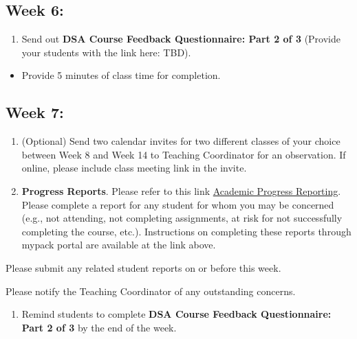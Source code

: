 \documentclass[
]{book}
\providecommand{\tightlist}{%
  \setlength{\itemsep}{0pt}\setlength{\parskip}{0pt}}
\begin{document}
\hypertarget{week-6}{%
\subsection{Week 6:}\label{week-6}}

\begin{enumerate}
\def\labelenumi{\arabic{enumi})}
\tightlist
\item
  Send out { \textbf{DSA Course Feedback Questionnaire: Part 2 of 3} } (Provide your students with the link here: TBD).
\end{enumerate}

\begin{itemize}
\tightlist
\item
  Provide 5 minutes of class time for completion.
\end{itemize}

\hypertarget{week-7}{%
\subsection{Week 7:}\label{week-7}}

\begin{enumerate}
\def\labelenumi{\arabic{enumi})}
\item
  (Optional) Send two calendar invites for two different classes of your choice between Week 8 and Week 14 to Teaching Coordinator for an observation. If online, please include class meeting link in the invite.
\item
  \textbf{Progress Reports}. Please refer to this link \href{https://dasa.ncsu.edu/faculty-resources/academic-progress-reporting/}{Academic Progress Reporting}. Please complete a report for any student for whom you may be concerned (e.g., not attending, not completing assignments, at risk for not successfully completing the course, etc.). Instructions on completing these reports through mypack portal are available at the link above.
\end{enumerate}

Please submit any related student reports on or before this week.

Please notify the Teaching Coordinator of any outstanding concerns.

\begin{enumerate}
\def\labelenumi{\arabic{enumi})}
\setcounter{enumi}{2}
\tightlist
\item
  Remind students to complete \textbf{DSA Course Feedback Questionnaire: Part 2 of 3} by the end of the week.
\end{enumerate}
\end{document}
